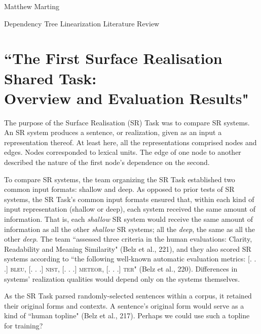 \documentclass[12pt,letterpaper]{article}
\def \mylastname {Marting}
\def \myname {Matthew \mylastname{}}
\begin{document}
\begin{flushleft}
  \myname{}\\
  {\centering{}Dependency Tree Linearization Literature Review\par{}}
  \setlength{\parindent}{0.5in}
  \section*{``The First Surface Realisation Shared Task:\\
  Overview and Evaluation Results"}
  The purpose of the Surface Realisation (SR) Task was to compare SR systems. An SR system produces a sentence, or realization, given as an input a representation thereof. At least here, all the representations comprised nodes and edges. Nodes corresponded to lexical units. The edge of one node to another described the nature of the first node's dependence on the second.

  To compare SR systems, the team organizing the SR Task established two common input formats: shallow and deep. As opposed to prior tests of SR systems, the SR Task's common input formats ensured that, within each kind of input representation (shallow or deep), each system received the same amount of information. That is, each \textit{shallow} SR system would receive the same amount of information as all the other \textit{shallow} SR systems; all the \textit{deep}, the same as all the other \textit{deep}. The team ``assessed three criteria in the human evaluations: Clarity, Readability and Meaning Similarity" (Belz et al., 221), and they also scored SR systems according to ``the following well-known automatic evaluation metrics: [. . .] \textsc{bleu}, [. . .] \textsc{nist}, [. . .] \textsc{meteor}, [. . .] \textsc{ter}" (Belz et al., 220). Differences in systems' realization qualities would depend only on the systems themselves.

  As the SR Task parsed randomly-selected sentences within a corpus, it retained their original forms and contexts. A sentence's original form would serve as a kind of ``human topline" (Belz et al., 217). Perhaps we could use such a topline for training?


\end{flushleft}
\end{document}
